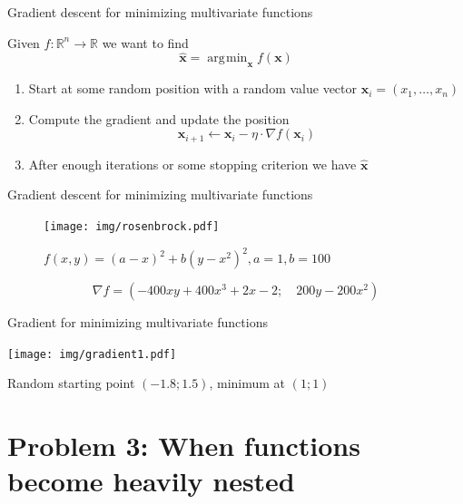 \documentclass[12pt,aspectratio=169,handout]{beamer}
\DeclareMathOperator*{\argmin}{arg\!\min}
\begin{document}
\begin{frame}{Gradient descent for minimizing multivariate functions}
	
	Given $f: \mathbb{R}^n \to \mathbb{R}$ we want to find
	$$\hat{\bm{x}} = \argmin_{\bm{x}} f(\bm{x})$$
	
	\begin{enumerate}
		\item Start at some random position with a random value vector $\bm{x}_i = (x_1, \ldots, x_n)$
		\item Compute the gradient and update the position
		$$
		\bm{x}_{i + 1} \gets \bm{x}_i - \eta \cdot \nabla f (\bm{x}_i)
		$$
		\item After enough iterations or some stopping criterion we have $\hat{\bm{x}}$
	\end{enumerate}
	
	
	
\end{frame}

\begin{frame}{Gradient descent for minimizing multivariate functions}
	
	\begin{figure}
		\centering
		\texttt{[image: img/rosenbrock.pdf]}
		\caption{$f(x,y)=(a-x)^{2}+b(y-x^{2})^{2}, a = 1, b = 100$}
	\end{figure}
	$$\nabla f = \left(-400xy+400x^3+2x-2; \quad 200y-200x^2 \right)$$
	
\end{frame}

\begin{frame}{Gradient for minimizing multivariate functions}
	
	\texttt{[image: img/gradient1.pdf]}
	
	
	Random starting point $(-1.8; 1.5)$, minimum at $(1; 1)$
	
\end{frame}

\section{Problem 3: When functions become heavily nested}
\end{document}
